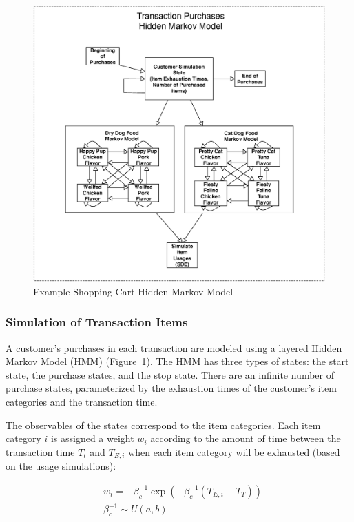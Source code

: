 \documentclass[conference]{IEEEtran}
\begin{document}
\begin{figure}[!t]
  \centering
  \includegraphics[width=6in]{figures/shopping_cart_simulation.eps}
  \caption{Example Shopping Cart Hidden Markov Model}
  \label{fig:shopping_cart_sim}
\end{figure}

\subsubsection{Simulation of Transaction Items} \label{sec:transaction-purchases}

A customer's purchases in each transaction are modeled using a layered Hidden Markov Model (HMM) (Figure~\ref{fig:shopping_cart_sim}).  The HMM has three types of states: the start state, the purchase states, and the stop state. There are an infinite number of purchase states, parameterized by the exhaustion times of the customer's item categories and the transaction time.

The observables of the states correspond to the item categories.  Each item category $i$ is assigned a weight $w_i$ according to the amount of time between the transaction time $T_t$ and $T_{E,i}$ when each item category will be exhausted (based on the usage simulations):

\begin{align} \label{eq:category-weights}
&w_i = - \beta^{-1}_c \exp(-\beta^{-1}_c (T_{E, i}- T_T)) \\
&\beta^{-1}_c \sim U(a,b) \nonumber
\end{align}
\end{document}
